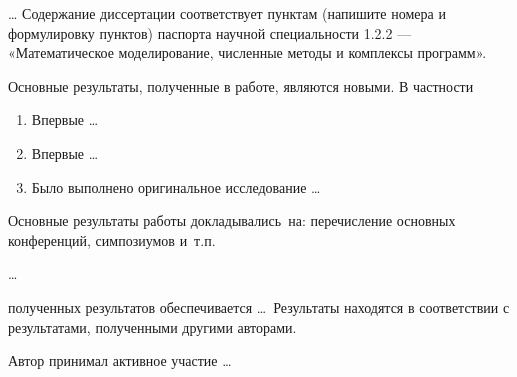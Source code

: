 {\compliances} \ldots
Содержание диссертации соответствует пунктам (напишите номера и формулировку
пунктов) паспорта научной специальности 1.2.2 — «Математическое моделирование,
численные методы и комплексы программ».

{\novelty}
Основные результаты, полученные в работе, являются новыми. В частности
\begin{enumerate}[beginpenalty=10000] %
	\item Впервые \ldots
	\item Впервые \ldots
	\item Было выполнено оригинальное исследование \ldots
\end{enumerate}

{\probation}
Основные результаты работы докладывались~на:
перечисление основных конференций, симпозиумов и~т.\:п.

{\influence} \ldots

{\reliability} полученных результатов обеспечивается \ldots \ Результаты находятся в соответствии с результатами, полученными другими авторами.

{\contribution} Автор принимал активное участие \ldots